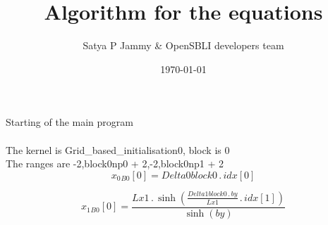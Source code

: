 \documentclass{article}
\title{Algorithm for the equations}
\author{Satya P Jammy \& OpenSBLI developers team}
\date{\today}
\begin{document}
\maketitle
\noindent Starting of the main program\\
\\\noindent The kernel is Grid_based_initialisation0, block is 0\\\noindent The ranges are -2,block0np0 + 2,-2,block0np1 + 2\\\begin{dmath}{x_{0}{_{B0}}}[{0}] = Delta0block0 \,.\, {idx}[{0}]\end{dmath}

\begin{dmath}{x_{1}{_{B0}}}[{0}] = \frac{Lx1 \,.\, \sinh{\left (\frac{Delta1block0 \,.\, by}{Lx1} \,.\, {idx}[{1}] \right )}}{\sinh{\left (by \right )}}\end{dmath}
\end{document}
